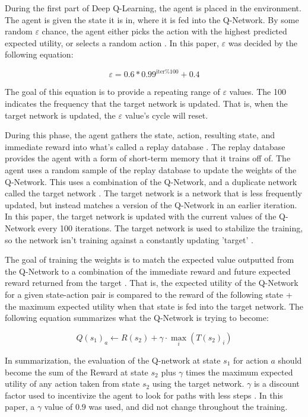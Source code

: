 \documentclass[12pt,letterpaper]{article}
\begin{document}
During the first part of Deep Q-Learning, the agent is placed in the environment.
The agent is given the state it is in, where it is fed into the Q-Network.
By some random $\varepsilon$ chance, the agent either picks the action with the highest predicted expected utility, or selects a random action \cite{article_reinforcement_learning_survey}.
In this paper, $\varepsilon$ was decided by the following equation:

$$\varepsilon = 0.6 * 0.99^{\text{iter} \% 100} + 0.4$$

The goal of this equation is to provide a repeating range of $\varepsilon$ values.
The 100 indicates the frequency that the target network is updated.
That is, when the target network is updated, the $\varepsilon$ value's cycle will reset.

During this phase, the agent gathers the state, action, resulting state, and immediate reward into what's called a replay database \cite{article_reinforcement_learning_for_robots}.
The replay database provides the agent with a form of short-term memory that it trains off of.
The agent uses a random sample of the replay database to update the weights of the Q-Network.
This uses a combination of the Q-Network, and a duplicate network called the target network \cite{article_human_level_control_deep_reinforcement_learning}.
The target network is a network that is less frequently updated, but instead matches a version of the Q-Network in an earlier iteration.
In this paper, the target network is updated with the current values of the Q-Network every 100 iterations.
The target network is used to stabilize the training, so the network isn't training against a constantly updating 'target' \cite{article_human_level_control_deep_reinforcement_learning}.

The goal of training the weights is to match the expected value outputted from the Q-Network to a combination of the immediate reward and future expected reward returned from the target \cite{article_reinforcement_learning_survey}.
That is, the expected utility of the Q-Network for a given state-action pair is compared to the reward of the following state + the maximum expected utility when that state is fed into the target network.
The following equation summarizes what the Q-Network is trying to become:

$$Q(s_{1})_{a} \leftarrow R(s_2) + \gamma \cdot \max_i(T(s_2)_i)$$

In summarization, the evaluation of the Q-network at state  $s_1$ for action $a$ should become the sum of the Reward at state $s_2$ plus $\gamma$ times the maximum expected utility of any action taken from state $s_2$ using the target network.
$\gamma$ is a discount factor used to incentivize the agent to look for paths with less steps \cite{article_reinforcement_learning_for_robots}.
In this paper, a $\gamma$ value of $0.9$ was used, and did not change throughout the training.
\end{document}
